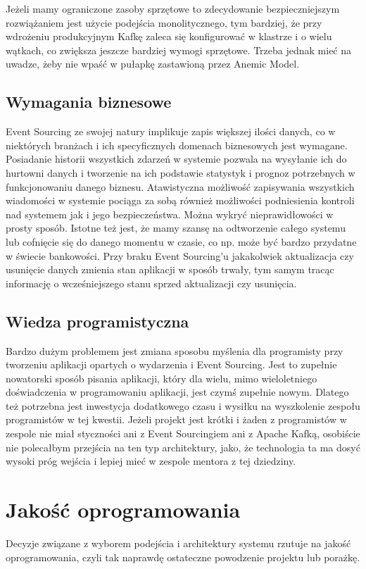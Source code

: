 Jeżeli mamy ograniczone zasoby sprzętowe to zdecydowanie bezpieczniejszym rozwiążaniem jest użycie podejścia monolitycznego, tym bardziej, że przy wdrożeniu produkcyjnym Kafkę zaleca się konfigurować w klastrze i o wielu wątkach, co zwiększa jeszcze bardziej wymogi sprzętowe. Trzeba jednak mieć na uwadze, żeby nie wpaść w pułapkę zastawioną przez Anemic Model.

\subsection{Wymagania biznesowe}
Event Sourcing ze swojej natury implikuje zapis większej ilości danych, co w niektórych branżach i ich specyficznych domenach biznesowych jest wymagane.  Posiadanie historii wszystkich zdarzeń w systemie pozwala na wysyłanie ich do hurtowni danych i tworzenie na ich podstawie statystyk i prognoz potrzebnych w funkcjonowaniu danego biznesu. 
Atawistyczna możliwość zapisywania wszystkich wiadomości w systemie pociąga za sobą również możliwości podniesienia kontroli nad systemem jak i jego bezpieczeństwa. Można wykryć nieprawidłowości w prosty sposób. Istotne też jest, że mamy szansę na odtworzenie całego systemu lub cofnięcie się do danego momentu w czasie, co np. może być bardzo przydatne w świecie bankowości.
Przy braku Event Sourcing'u jakakolwiek aktualizacja czy usunięcie danych zmienia stan aplikacji w sposób trwały, tym samym tracąc informację o wcześniejszego stanu sprzed aktualizacji czy usunięcia.

\subsection{Wiedza programistyczna}
Bardzo dużym problemem jest zmiana sposobu myślenia dla programisty przy tworzeniu aplikacji opartych o wydarzenia i Event Sourcing. Jest to zupełnie nowatorski sposób pisania aplikacji, który dla wielu, mimo wieloletniego doświadczenia w programowaniu aplikacji, jest czymś zupełnie nowym. Dlatego też potrzebna jest inwestycja dodatkowego czasu i wysiłku na wyszkolenie zespołu programistów w tej kwestii. 
Jeżeli projekt jest krótki i żaden z programistów w zespole nie miał styczności ani z Event Sourcingiem ani z Apache Kafką, osobiście nie polecałbym przejścia na ten typ architektury, jako, że technologia ta ma dosyć wysoki próg wejścia i lepiej mieć w zespole mentora z tej dziedziny.

\section{Jakość oprogramowania}
Decyzje związane z wyborem podejścia i architektury systemu rzutuje na jakość oprogramowania, czyli tak naprawdę ostateczne powodzenie projektu lub porażkę.


